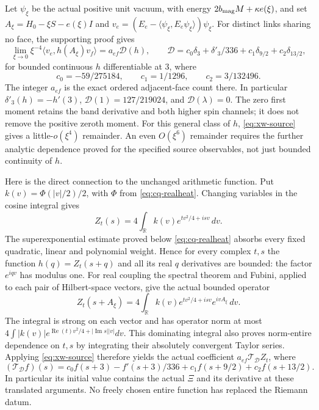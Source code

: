 Let $\psi_\xi$ be the actual positive unit vacuum, with energy
$2b_{\rm mag}M+\kappa e(\xi)$, and set
$A_\xi=H_0-\xi S-e(\xi)I$ and
$v_e=(E_e-\langle\psi_\xi,E_e\psi_\xi\rangle)\psi_\xi$.
For distinct links sharing no face, the supporting proof gives
\begin{equation}
 \lim_{\xi\to0}\xi^{-4}
       \langle v_e,h(A_\xi)v_f\rangle=a_{ef}\mathcal D(h),\qquad
 \mathcal D=c_0\delta_3+\delta'_3/336+
                         c_1\delta_{9/2}+c_2\delta_{13/2},
 \label{eq:xw-source}
\end{equation}
for bounded continuous $h$ differentiable at $3$, where
\[
 c_0=-59/275184,\qquad c_1=1/1296,\qquad c_2=3/132496.
\]
The integer $a_{ef}$ is the exact ordered adjacent-face count there.
In particular $\delta'_3(h)=-h'(3)$,
$\mathcal D(1)=127/219024$, and $\mathcal D(\lambda)=0$.
The zero first moment retains the band derivative and both higher
spin channels; it does not remove the positive zeroth moment.
For this general class of $h$, \eqref{eq:xw-source} gives a
little-$o(\xi^4)$ remainder. An even $O(\xi^6)$ remainder requires
the further analytic dependence proved for the specified source
observables, not just bounded continuity of $h$.

Here is the direct connection to the unchanged arithmetic function.
Put $k(v)=\Phi(|v|/2)/2$, with $\Phi$ from
\eqref{eq:cq-realheat}. Changing variables in the cosine integral gives
\[
 Z_t(s)=4\int_{\mathbb R}k(v)e^{tv^2/4+isv}\,dv.
\]
The superexponential estimate proved below
\eqref{eq:cq-realheat} absorbs every fixed quadratic, linear and
polynomial weight. Hence for every complex $t,s$ the function
$h(q)=Z_t(s+q)$ and all its real $q$ derivatives are bounded:
the factor $e^{iqv}$ has modulus one. For real coupling the spectral
theorem and Fubini, applied to each pair of Hilbert-space vectors,
give the actual bounded operator
\[
 Z_t(s+A_\xi)=4\int_{\mathbb R}
          k(v)e^{tv^2/4+isv}e^{ivA_\xi}\,dv.
\]
The integral is strong on each vector and has operator norm at most
$4\int|k(v)|e^{\operatorname{Re}(t)v^2/4+|\operatorname{Im}s||v|}dv$.
This dominating integral also proves norm-entire dependence on
$t,s$ by integrating their absolutely convergent Taylor series.
Applying \eqref{eq:xw-source} therefore yields the actual coefficient
$a_{ef}\mathcal T_{\mathcal D}Z_t$, where
\begin{equation}
 (\mathcal T_{\mathcal D}f)(s)
 =c_0f(s+3)-f'(s+3)/336+
                          c_1f(s+9/2)+c_2f(s+13/2).
 \label{eq:xw-TD}
\end{equation}
In particular its initial value contains the actual $\Xi$ and its
derivative at these translated arguments. No freely chosen entire
function has replaced the Riemann datum.

